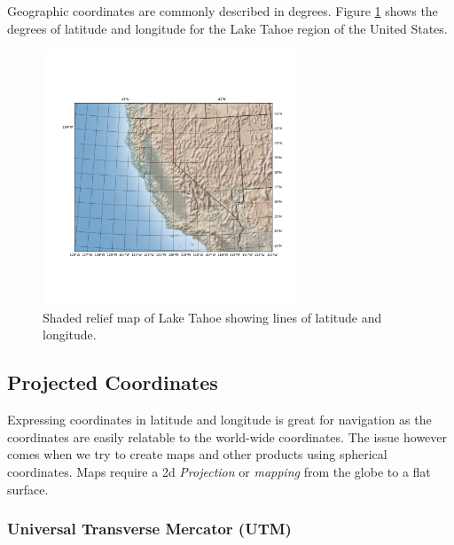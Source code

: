 Geographic coordinates are commonly described in degrees.  Figure 
\ref{fig:figure_1_1} shows the degrees of latitude and longitude
for the Lake Tahoe region of the United States.

\begin{figure}[h!]
\includegraphics[width=3in]{chapter1/diagrams/figure_1_1.png}
\caption{Shaded relief map of Lake Tahoe showing lines of latitude and longitude.}
\label{fig:figure_1_1}
\end{figure}

\subsection*{Projected Coordinates}

Expressing coordinates in latitude and longitude is great for navigation 
as the coordinates are easily relatable to the world-wide coordinates. 
The issue however comes when we try to create maps and other products using
spherical coordinates.  Maps require a 2d \emph{Projection} or \emph{mapping}
from the globe to a flat surface.  


\subsubsection*{Universal Transverse Mercator (UTM)}




